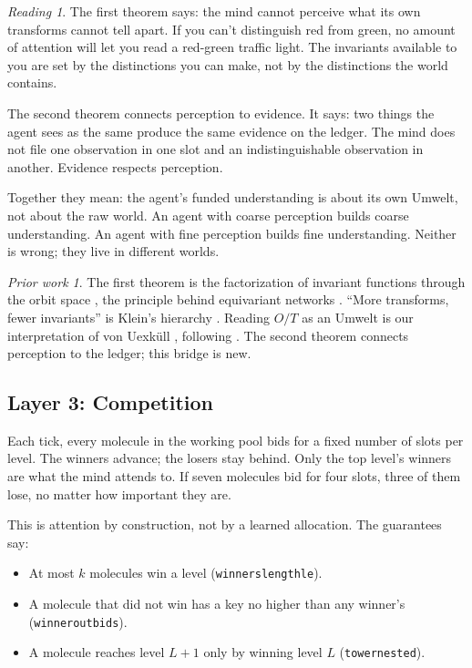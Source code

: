 \documentclass[11pt]{article}
\newcommand{\leanus}{\textunderscore\allowbreak}
\newcommand{\lean}[1]{{\let\_\leanus\texttt{#1}}}
\theoremstyle{remark}
\newtheorem*{reading}{Reading}
\newtheorem*{prior}{Prior work}
\begin{document}
\begin{reading}
The first theorem says: the mind cannot perceive what its own transforms cannot tell apart.
If you can't distinguish red from green, no amount of attention will let you read a
red-green traffic light. The invariants available to you are set by the distinctions you
can make, not by the distinctions the world contains.

The second theorem connects perception to evidence. It says: two things the agent sees as
the same produce the same evidence on the ledger. The mind does not file one observation
in one slot and an indistinguishable observation in another. Evidence respects perception.

Together they mean: the agent's funded understanding is about its own Umwelt, not about
the raw world. An agent with coarse perception builds coarse understanding. An agent with
fine perception builds fine understanding. Neither is wrong; they live in different worlds.
\end{reading}

\begin{prior}
The first theorem is the factorization of invariant functions through the orbit space
\citep{LehmannRomano2005,Bronstein2021}, the principle behind equivariant networks
\citep{CohenWelling2016}. ``More transforms, fewer invariants'' is Klein's hierarchy
\citep{Klein1893}. Reading $O/T$ as an Umwelt is our interpretation of von Uexk\"ull
\citep{Uexkull2010}, following \citet{Cassirer1944}. The second theorem connects
perception to the ledger; this bridge is new.
\end{prior}

\subsection{Layer 3: Competition}

Each tick, every molecule in the working pool bids for a fixed number of slots per level.
The winners advance; the losers stay behind. Only the top level's winners are what the mind
attends to. If seven molecules bid for four slots, three of them lose, no matter how
important they are.

This is attention by construction, not by a learned allocation. The guarantees say:

\begin{itemize}[nosep]
    \item At most $k$ molecules win a level (\lean{winners\_length\_le}).
    \item A molecule that did not win has a key no higher than any winner's
    (\lean{winner\_outbids}).
    \item A molecule reaches level $L{+}1$ only by winning level $L$
    (\lean{tower\_nested}).
\end{itemize}
\end{document}

